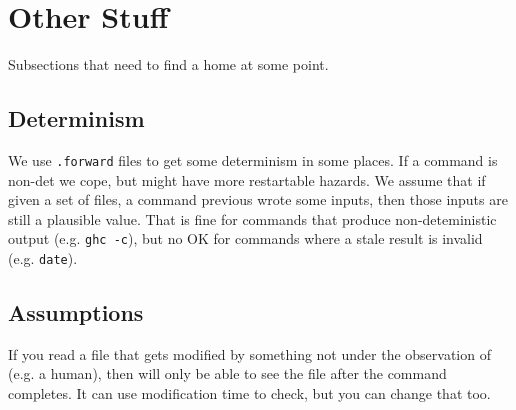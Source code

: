 \section{Other Stuff}

Subsections that need to find a home at some point.

\subsection{Determinism}
\label{sec:determinism}

We use \texttt{.forward} files to get some determinism in some places. If a command is non-det we cope, but might have more restartable hazards. We assume that if given a set of files, a command previous wrote some inputs, then those inputs are still a plausible value. That is fine for commands that produce non-deteministic output (e.g. \texttt{ghc -c}), but no OK for commands where a stale result is invalid (e.g. \texttt{date}).

\subsection{Assumptions}

If you read a file that gets modified by something not under the observation of \Rattle (e.g. a human), then \Rattle will only be able to see the file after the command completes. It can use modification time to check, but you can change that too.
